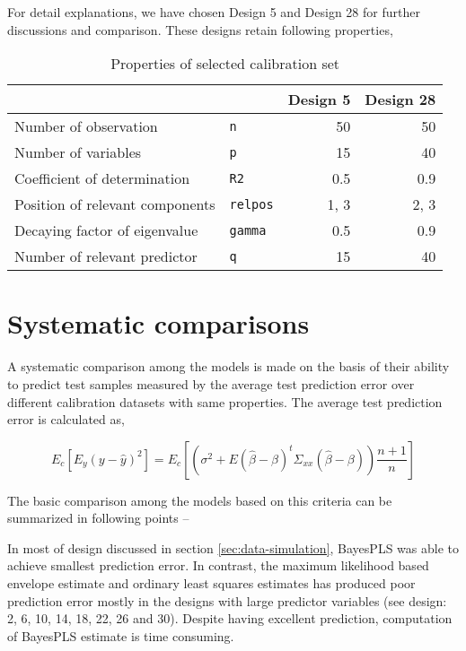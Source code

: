 \documentclass[a4paper, 11pt]{article}
\begin{document}
For detail explanations, we have chosen Design 5 and Design 28 for further discussions and comparison. These designs retain following properties, 

\begin{table}[ht]
\centering 
\begin{tabularx}{0.8\textwidth}{Xlrr}
  \hline
                                  &              & Design 5 & Design 28 \\ 
  \hline\hline
  Number of observation           & {\tt n}      & 50       & 50 \\ 
  Number of variables             & {\tt p}      & 15       & 40 \\ 
  Coefficient of determination    & {\tt R2}     & 0.5      & 0.9 \\ 
  Position of relevant components & {\tt relpos} & 1, 3     & 2, 3 \\ 
  Decaying factor of eigenvalue   & {\tt gamma}  & 0.5      & 0.9 \\ 
  Number of relevant predictor    & {\tt q}      & 15       & 40 \\ 
  \hline
\end{tabularx}
\caption{Properties of selected calibration set} 

\label{tab:selected-design}
\end{table}

\section{Systematic comparisons}
A systematic comparison among the models is made on the basis of their ability to predict test samples measured by the average test prediction error over different calibration datasets with same properties. The average test prediction error is calculated as,

\begin{equation*}
    E_c\left[E_y\left(y - \hat{y}\right)^2\right] =
    E_c\left[\left(\sigma^2 + E\left(\hat{\beta} - \beta\right)^t\Sigma_{xx}\left(\hat{\beta} - \beta\right)\right)\frac{n+1}{n}\right]
\end{equation*}

The basic comparison among the models based on this criteria can be summarized in following points --

In most of design discussed in section \ref{sec:data-simulation}, BayesPLS was able to achieve smallest prediction error. In contrast, the maximum likelihood based envelope estimate and ordinary least squares estimates has produced poor prediction error mostly in the designs with large predictor variables (see design: 2, 6, 10, 14, 18, 22, 26 and 30). Despite having excellent prediction, computation of BayesPLS estimate is time consuming. 
\end{document}
